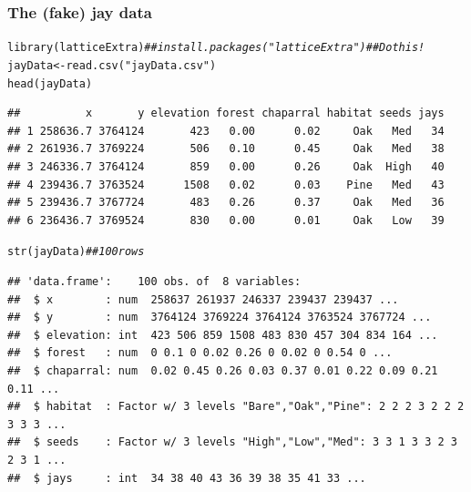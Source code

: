\documentclass[color=usenames,dvipsnames]{beamer}\usepackage[]{graphicx}\usepackage[]{color}
\makeatletter
\newcommand{\hlstr}[1]{\textcolor[rgb]{0.749,0.012,0.012}{#1}}%
\newcommand{\hlcom}[1]{\textcolor[rgb]{0.514,0.506,0.514}{\textit{#1}}}%
\newcommand{\hlstd}[1]{\textcolor[rgb]{0,0,0}{#1}}%
\newcommand{\hlkwb}[1]{\textcolor[rgb]{0,0.341,0.682}{#1}}%
\newcommand{\hlkwd}[1]{\textcolor[rgb]{0.004,0.004,0.506}{#1}}%
\newenvironment{kframe}{%
 \def\at@end@of@kframe{}%
 \ifinner\ifhmode%
  \def\at@end@of@kframe{\end{minipage}}%
  \begin{minipage}{\columnwidth}%
 \fi\fi%
 \def\FrameCommand##1{\hskip\@totalleftmargin \hskip-\fboxsep
 \colorbox{shadecolor}{##1}\hskip-\fboxsep
     \hskip-\linewidth \hskip-\@totalleftmargin \hskip\columnwidth}%
 \MakeFramed {\advance\hsize-\width
   \@totalleftmargin\z@ \linewidth\hsize
   \@setminipage}}%
 {\par\unskip\endMakeFramed%
 \at@end@of@kframe}
\newenvironment{knitrout}{}{} %
\makeatother
\begin{document}
\begin{frame}[fragile]
  \frametitle{The (fake) jay data}
  \footnotesize
\begin{knitrout}\scriptsize
{}\color{fgcolor}\begin{kframe}
\begin{alltt}
\hlkwd{library}\hlstd{(latticeExtra)} \hlcom{## install.packages("latticeExtra") ## Do this!}
\hlstd{jayData} \hlkwb{<-} \hlkwd{read.csv}\hlstd{(}\hlstr{"jayData.csv"}\hlstd{)}
\hlkwd{head}\hlstd{(jayData)}
\end{alltt}
\begin{verbatim}
##          x       y elevation forest chaparral habitat seeds jays
## 1 258636.7 3764124       423   0.00      0.02     Oak   Med   34
## 2 261936.7 3769224       506   0.10      0.45     Oak   Med   38
## 3 246336.7 3764124       859   0.00      0.26     Oak  High   40
## 4 239436.7 3763524      1508   0.02      0.03    Pine   Med   43
## 5 239436.7 3767724       483   0.26      0.37     Oak   Med   36
## 6 236436.7 3769524       830   0.00      0.01     Oak   Low   39
\end{verbatim}
\end{kframe}
\end{knitrout}
\begin{knitrout}\scriptsize
{}\color{fgcolor}\begin{kframe}
\begin{alltt}
\hlkwd{str}\hlstd{(jayData)} \hlcom{## 100 rows}
\end{alltt}
\begin{verbatim}
## 'data.frame':	100 obs. of  8 variables:
##  $ x        : num  258637 261937 246337 239437 239437 ...
##  $ y        : num  3764124 3769224 3764124 3763524 3767724 ...
##  $ elevation: int  423 506 859 1508 483 830 457 304 834 164 ...
##  $ forest   : num  0 0.1 0 0.02 0.26 0 0.02 0 0.54 0 ...
##  $ chaparral: num  0.02 0.45 0.26 0.03 0.37 0.01 0.22 0.09 0.21 0.11 ...
##  $ habitat  : Factor w/ 3 levels "Bare","Oak","Pine": 2 2 2 3 2 2 2 3 3 3 ...
##  $ seeds    : Factor w/ 3 levels "High","Low","Med": 3 3 1 3 3 2 3 2 3 1 ...
##  $ jays     : int  34 38 40 43 36 39 38 35 41 33 ...
\end{verbatim}
\end{kframe}
\end{knitrout}
\end{frame}
\end{document}
